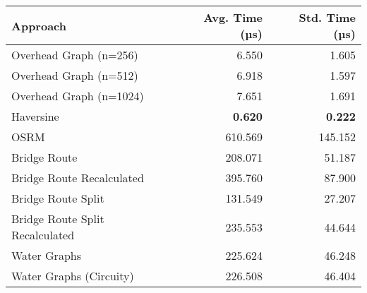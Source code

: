 \begin{tabular}{lrr}
\toprule
Approach & Avg. Time (µs) & Std. Time (µs) \\
\midrule
Overhead Graph (n=256) & 6.550 & 1.605 \\
Overhead Graph (n=512) & 6.918 & 1.597 \\
Overhead Graph (n=1024) & 7.651 & 1.691 \\
Haversine & \textbf{0.620} & \textbf{0.222} \\
OSRM & 610.569 & 145.152 \\
Bridge Route & 208.071 & 51.187 \\
Bridge Route Recalculated & 395.760 & 87.900 \\
Bridge Route Split & 131.549 & 27.207 \\
Bridge Route Split Recalculated & 235.553 & 44.644 \\
Water Graphs & 225.624 & 46.248 \\
Water Graphs (Circuity) & 226.508 & 46.404 \\
\bottomrule
\end{tabular}
